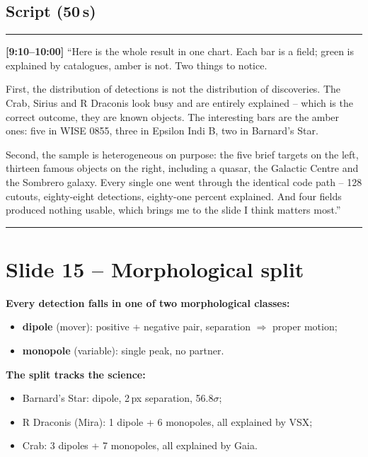 \documentclass[11pt,a4paper]{article}
\begin{document}
\subsection*{Script (50\,s)}
\noindent\rule{\linewidth}{0.3pt}\par\smallskip\noindent
\textbf{[9:10--10:00]} ``Here is the whole result in one chart. Each bar is a field; green is explained by
catalogues, amber is not. Two things to notice.

First, the distribution of detections is not the distribution of discoveries. The Crab, Sirius and R
Draconis look busy and are entirely explained -- which is the correct outcome, they are known objects.
The interesting bars are the amber ones: five in WISE 0855, three in Epsilon Indi B, two in Barnard's
Star.

Second, the sample is heterogeneous on purpose: the five brief targets on the left, thirteen famous
objects on the right, including a quasar, the Galactic Centre and the Sombrero galaxy. Every single one
went through the identical code path -- 128 cutouts, eighty-eight detections, eighty-one percent
explained. And four fields produced nothing usable, which brings me to the slide I think matters most.''
\par\smallskip\noindent\rule{\linewidth}{0.3pt}

\section{Slide 15 -- Morphological split}

\textbf{Every detection falls in one of two morphological classes:}
\begin{itemize}[leftmargin=1em,itemsep=1pt]
\item \textbf{dipole} (mover): positive + negative pair, separation $\Rightarrow$ proper motion;
\item \textbf{monopole} (variable): single peak, no partner.
\end{itemize}

\textbf{The split tracks the science:}
\begin{itemize}[leftmargin=1em,itemsep=1pt]
\item Barnard's Star: dipole, 2\,px separation, 56.8$\sigma$;
\item R Draconis (Mira): 1 dipole + 6 monopoles, all explained by VSX;
\item Crab: 3 dipoles + 7 monopoles, all explained by Gaia.
\end{itemize}
\end{document}
